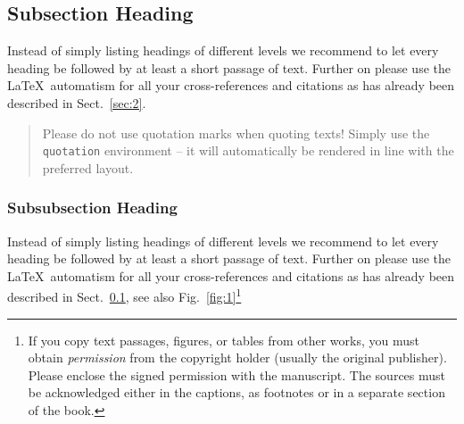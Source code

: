 \documentclass[graybox]{svmult}
\begin{document}



\subsection{Subsection Heading}
\label{subsec:2}
Instead of simply listing headings of different levels we recommend to let every heading be followed by at least a short passage of text.  Further on please use the \LaTeX\ automatism for all your cross-references and citations as has already been described in Sect.~\ref{sec:2}.

\begin{quotation}
Please do not use quotation marks when quoting texts! Simply use the \verb|quotation| environment -- it will automatically be rendered in line with the preferred layout.
\end{quotation}


\subsubsection{Subsubsection Heading}
Instead of simply listing headings of different levels we recommend to let every heading be followed by at least a short passage of text.  Further on please use the \LaTeX\ automatism for all your cross-references and citations as has already been described in Sect.~\ref{subsec:2}, see also Fig.~\ref{fig:1}\footnote{If you copy text passages, figures, or tables from other works, you must obtain \textit{permission} from the copyright holder (usually the original publisher). Please enclose the signed permission with the manuscript. The sources must be acknowledged either in the captions, as footnotes or in a separate section of the book.}
\end{document}
